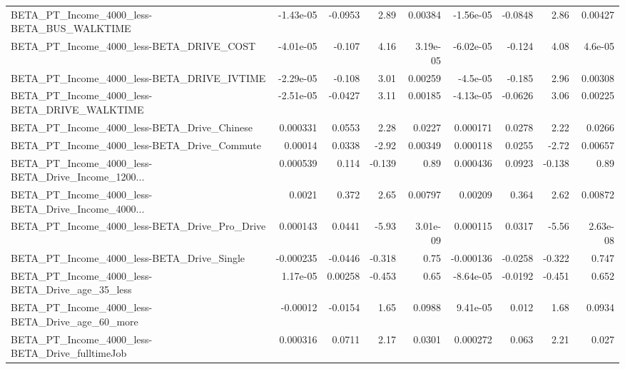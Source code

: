 \begin{tabular}{lrrrrrrrr}
BETA\_PT\_Income\_4000\_less-BETA\_BUS\_WALKTIME         &   -1.43e-05 &      -0.0953 &      2.89 &  0.00384 &  -1.56e-05 &     -0.0848 &         2.86 &       0.00427 \\
BETA\_PT\_Income\_4000\_less-BETA\_DRIVE\_COST           &   -4.01e-05 &       -0.107 &      4.16 & 3.19e-05 &  -6.02e-05 &      -0.124 &         4.08 &       4.6e-05 \\
BETA\_PT\_Income\_4000\_less-BETA\_DRIVE\_IVTIME         &   -2.29e-05 &       -0.108 &      3.01 &  0.00259 &   -4.5e-05 &      -0.185 &         2.96 &       0.00308 \\
BETA\_PT\_Income\_4000\_less-BETA\_DRIVE\_WALKTIME       &   -2.51e-05 &      -0.0427 &      3.11 &  0.00185 &  -4.13e-05 &     -0.0626 &         3.06 &       0.00225 \\
BETA\_PT\_Income\_4000\_less-BETA\_Drive\_Chinese        &    0.000331 &       0.0553 &      2.28 &   0.0227 &   0.000171 &      0.0278 &         2.22 &        0.0266 \\
BETA\_PT\_Income\_4000\_less-BETA\_Drive\_Commute        &     0.00014 &       0.0338 &     -2.92 &  0.00349 &   0.000118 &      0.0255 &        -2.72 &       0.00657 \\
BETA\_PT\_Income\_4000\_less-BETA\_Drive\_Income\_1200... &    0.000539 &        0.114 &    -0.139 &     0.89 &   0.000436 &      0.0923 &       -0.138 &          0.89 \\
BETA\_PT\_Income\_4000\_less-BETA\_Drive\_Income\_4000... &      0.0021 &        0.372 &      2.65 &  0.00797 &    0.00209 &       0.364 &         2.62 &       0.00872 \\
BETA\_PT\_Income\_4000\_less-BETA\_Drive\_Pro\_Drive      &    0.000143 &       0.0441 &     -5.93 & 3.01e-09 &   0.000115 &      0.0317 &        -5.56 &      2.63e-08 \\
BETA\_PT\_Income\_4000\_less-BETA\_Drive\_Single         &   -0.000235 &      -0.0446 &    -0.318 &     0.75 &  -0.000136 &     -0.0258 &       -0.322 &         0.747 \\
BETA\_PT\_Income\_4000\_less-BETA\_Drive\_age\_35\_less    &    1.17e-05 &      0.00258 &    -0.453 &     0.65 &  -8.64e-05 &     -0.0192 &       -0.451 &         0.652 \\
BETA\_PT\_Income\_4000\_less-BETA\_Drive\_age\_60\_more    &    -0.00012 &      -0.0154 &      1.65 &   0.0988 &   9.41e-05 &       0.012 &         1.68 &        0.0934 \\
BETA\_PT\_Income\_4000\_less-BETA\_Drive\_fulltimeJob    &    0.000316 &       0.0711 &      2.17 &   0.0301 &   0.000272 &       0.063 &         2.21 &         0.027 \\

\end{tabular}
